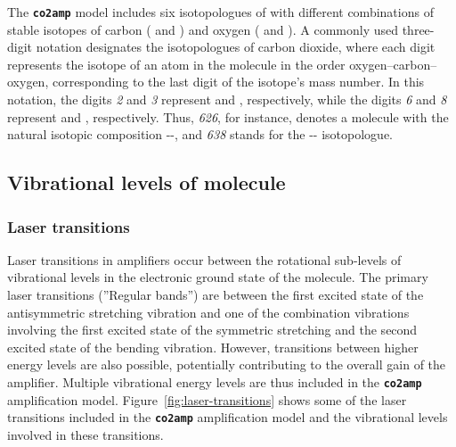 \documentclass{report}
\begin{document}
The \textbf{\texttt{co2amp}} model includes six isotopologues of  with different combinations of stable isotopes of carbon ( and ) and oxygen ( and ). A commonly used three-digit notation designates the isotopologues of carbon dioxide, where each digit represents the isotope of an atom in the molecule in the order oxygen–carbon–oxygen, corresponding to the last digit of the isotope's mass number. In this notation, the digits \textit{2} and \textit{3} represent  and , respectively, while the digits \textit{6} and \textit{8} represent  and , respectively. Thus, \textit{626}, for instance, denotes a  molecule with the natural isotopic composition --, and \textit{638} stands for the -- isotopologue.




\subsection{Vibrational levels of  molecule}

\subsubsection{Laser transitions}

Laser transitions in  amplifiers occur between the rotational sub-levels of vibrational levels in the electronic ground state of the molecule. The primary laser transitions (''Regular bands'') are between the first excited state of the antisymmetric stretching vibration and one of the combination vibrations involving the first excited state of the symmetric stretching and the second excited state of the bending vibration. However, transitions between higher energy levels are also possible, potentially contributing to the overall gain of the amplifier. Multiple vibrational energy levels are thus included in the \textbf{\texttt{co2amp}} amplification model. Figure~\ref{fig:laser-transitions} shows some of the laser transitions included in the \textbf{\texttt{co2amp}} amplification model and the vibrational levels involved in these transitions.
\end{document}

